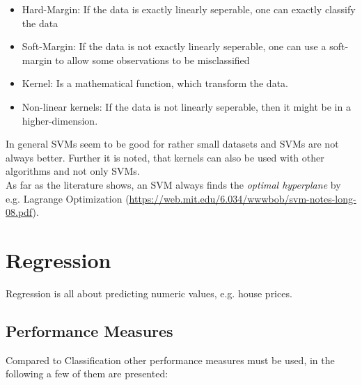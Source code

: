 \documentclass[12pt,a4paper]{article}
\begin{document}
\begin{itemize}
    \item Hard-Margin: If the data is exactly linearly seperable, one can exactly classify the data
    \item Soft-Margin: If the data is not exactly linearly seperable, one can use a soft-margin to allow some observations to be misclassified
    \item Kernel: Is a mathematical function, which transform the data.
    \item Non-linear kernels: If the data is not linearly seperable, then it might be in a higher-dimension.
\end{itemize}

\noindent In general SVMs seem to be good for rather small datasets and SVMs are not always better. Further it is noted, that kernels can also be used with other algorithms and not only SVMs.\\
As far as the literature shows, an SVM always finds the \textit{optimal hyperplane} by e.g. Lagrange Optimization (\url{https://web.mit.edu/6.034/wwwbob/svm-notes-long-08.pdf}).


\newpage
\section{Regression}

\noindent Regression is all about predicting numeric values, e.g. house prices.\\

\subsection{Performance Measures}

\noindent Compared to Classification other performance measures must be used, in the following a few of them are presented:
\end{document}
